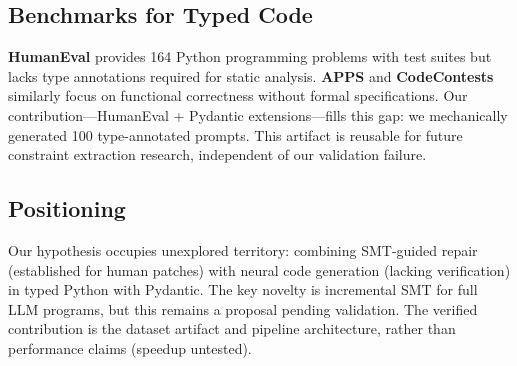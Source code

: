\subsection{Benchmarks for Typed Code}

\textbf{HumanEval} provides 164 Python programming problems with test suites but lacks type annotations required for static analysis. \textbf{APPS} and \textbf{CodeContests} similarly focus on functional correctness without formal specifications. Our contribution---HumanEval + Pydantic extensions---fills this gap: we mechanically generated 100 type-annotated prompts. This artifact is reusable for future constraint extraction research, independent of our validation failure.

\subsection{Positioning}

Our hypothesis occupies unexplored territory: combining SMT-guided repair (established for human patches) with neural code generation (lacking verification) in typed Python with Pydantic. The key novelty is incremental SMT for full LLM programs, but this remains a proposal pending validation. The verified contribution is the dataset artifact and pipeline architecture, rather than performance claims (speedup untested).
